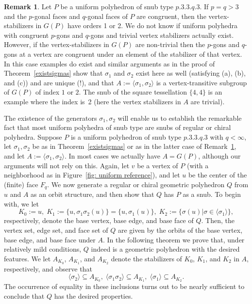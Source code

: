 \documentclass[12pt]{article}
\theoremstyle{definition}\newtheorem{definition}{Definition}[section]
\newtheorem{remark}{Remark}[]
\begin{document}
\begin{remark}
\label{remarkone}
Let $P$ be a uniform polyhedron of snub type $p.3.3.q.3$. If $p=q>3$ and the $p$-gonal faces and $q$-gonal faces of $P$ are congruent, then the vertex-stabilizers in $G(P)$ have orders 1 or 2. We do not know if uniform polyhedra with congruent $p$-gons and $q$-gons and trivial vertex stabilizers actually exist. However, if the vertex-stabilizers in $G(P)$ are non-trivial then the $p$-gons and $q$-gons at a vertex are congruent under an element of the stabilizer of that vertex. In this case examples do exist and similar arguments as in the proof of Theorem~\ref{existsigmas} show that $\sigma_1$ and $\sigma_2$ exist here as well (satisfying (a), (b), and (c)) and are unique (!), and that $A:=\langle\sigma_1,\sigma_2\rangle$ is a vertex-transitive subgroup of $G(P)$ of index $1$ or $2$. The snub of the square tessellation $\{4,4\}$ is an example where the index is~2 (here the vertex stabilizers in $A$ are trivial). 
\end{remark}
\smallskip 

The existence of the generators $\sigma_1,\sigma_2$ will enable us to establish the remarkable fact that most uniform polyhedra of snub type are snubs of regular or chiral polyhedra. Suppose $P$ is a uniform polyhedron of snub type $p.3.3.q.3$ with $q<\infty$, let $\sigma_1,\sigma_2$ be as in Theorem~\ref{existsigmas} or as in the latter case of Remark~\ref{remarkone}, and let $A:=\langle\sigma_1,\sigma_2\rangle$. In most cases we actually have $A=G(P)$, although our arguments will not rely on this. Again, let $v$ be a vertex of $P$ (with a neighborhood as in Figure~\ref{fig: uniform reference}), and let 
$u$ be the center of the (finite) face $F_q$. We now generate a regular or chiral geometric polyhedron $Q$ from $u$ and $A$ as an orbit structure, and then show that $Q$ has $P$ as a snub. To begin with, we let
\begin{equation}
\label{conversebase}
K_0:=u,\; K_1:=\{u,\sigma_1\sigma_2(u)\} = \{u,\sigma_1(u)\},\; 
K_2:=\{\sigma(u)|\sigma\in \langle \sigma_1 \rangle\},
\end{equation}
respectively, denote the base vertex, base edge, and base face of $Q$. Then, the vertex set, edge set, and face set of $Q$ are given by the orbits of the base vertex, base edge, and base face under $A$. In the following theorem we prove that, under relatively mild conditions, $Q$ indeed is a geometric polyhedron with the desired features. We let $A_{K_0}$, $A_{K_1}$, and $A_{K_2}$ denote the stabilizers of $K_0$, $K_1$, and $K_2$ in $A$, respectively, and observe that
\begin{equation}
\label{stabcond}
\langle \sigma_2 \rangle \subseteq A_{K_0},\; 
\langle \sigma_1\sigma_2 \rangle\subseteq A_{K_1},\;
\langle \sigma_1 \rangle\subseteq A_{K_2}.
\end{equation}
The occurrence of equality in these inclusions turns out to be nearly sufficient to conclude that $Q$ has the desired properties.
\smallskip
\end{document}

